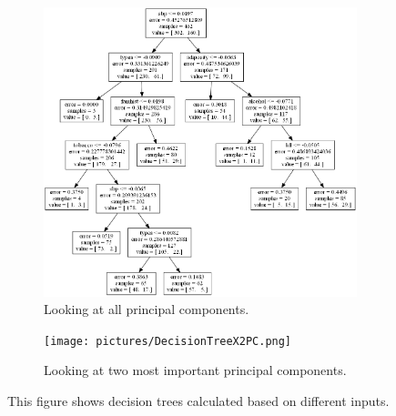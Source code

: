 \begin{figure}
	\begin{subfigure}[b]{0.5\textwidth}
	\includegraphics[scale=0.4]{pictures/Decision_Tree_XPC.png}
	\caption{Looking at all principal components.}
	\label{decisionTreeXPA}
	\end{subfigure}
	\begin{subfigure}[b]{0.5\textwidth}
	\texttt{[image: pictures/DecisionTreeX2PC.png]}
	\caption{Looking at two most important principal components.}
	\label{decisionTreeX2PA}
	\end{subfigure}
\caption{This figure shows decision trees calculated based on different inputs.}
\label{logicalRegressionResults}
\end{figure}